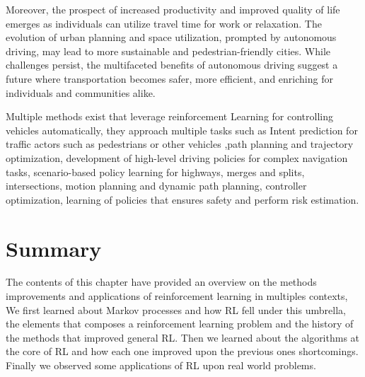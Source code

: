 Moreover, the prospect of increased productivity and improved quality of life emerges as individuals can utilize travel time for work or relaxation. The evolution of urban planning and space utilization, prompted by autonomous driving, may lead to more sustainable and pedestrian-friendly cities. While challenges persist, the multifaceted benefits of autonomous driving suggest a future where transportation becomes safer, more efficient, and enriching for individuals and communities alike.

Multiple methods exist that leverage reinforcement Learning for controlling vehicles automatically, they approach multiple tasks such as Intent prediction for traffic actors such as pedestrians or other vehicles \cite{},path planning and trajectory optimization\cite{}, development of high-level driving policies for complex navigation tasks\cite{},  scenario-based policy learning for highways\cite{}, merges and splits\cite{}, intersections\cite{}, motion planning and dynamic path planning\cite{}, controller optimization\cite{}, learning of policies that ensures safety and perform risk estimation\cite{}.

\section{Summary}\label{sec:rl-summary}
The contents of this chapter have provided an overview on the methods improvements and applications of reinforcement learning in multiples contexts, We first learned about Markov processes and how RL fell under this umbrella, the elements that composes a reinforcement learning problem and the history of the methods that improved general RL. Then we learned about the algorithms at the core of RL and how each one improved upon the previous ones shortcomings. Finally we observed some applications of RL upon real world problems.

